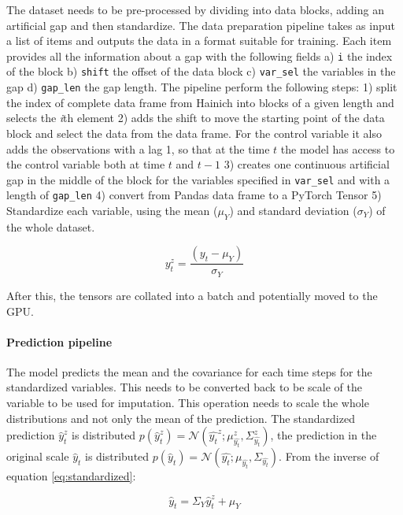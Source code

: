 \documentclass{article}
\newcommand{\norm}[3]{\mathcal{N}\left(#1; #2, #3\right)} %
\begin{document}
The dataset needs to be pre-processed by dividing into data blocks, adding an artificial gap and then standardize. The data preparation pipeline takes as input a list of items and outputs the data in a format suitable for training. Each item provides all the information about a gap with the following fields a) \verb|i| the index of the block b) \verb|shift|  the offset of the data block c) \verb|var_sel| the variables in the gap d) \verb|gap_len| the gap length. The pipeline perform the following steps: 1) split the index of complete data frame from Hainich into blocks of a given length and selects the \textit{i}th element  2) adds the shift to move the starting point of the data block and select the data from the data frame. For the control variable it also adds the observations with a lag 1, so that at the time $t$ the model has access to the control variable both at time $t$ and $t-1$ 3) creates one continuous artificial gap in the middle of the block for the variables specified in \verb|var_sel| and with a length of \verb|gap_len| 4) convert from Pandas data frame to a \textsf{PyTorch} Tensor 5) Standardize each variable, using the mean ($\mu_Y$) and standard deviation ($\sigma_Y$) of the whole dataset.

\begin{equation}\label{eq:standardized}
    y^z_t = \frac{(y_t - \mu_Y)}{\sigma_Y}
\end{equation}

After this, the tensors are collated into a batch and potentially moved to the GPU.

\paragraph{Prediction pipeline}

The model predicts the mean and the covariance for each time steps for the standardized variables. This needs to be converted back to be scale of the variable to be used for imputation. This operation needs to scale the whole distributions and not only the mean of the prediction. The standardized prediction $\hat{y}^z_t$ is distributed $p(\hat{y}^z_t) = \norm{\hat{y_t}^z}{\mu^z_{\hat{y_t}}}{\Sigma^z_{\hat{y_t}}}$, the prediction in the original scale $\hat{y}_t$ is distributed $p(\hat{y}_t) =  \norm{\hat{y_t}}{\mu_{\hat{y_t}}}{\Sigma_{\hat{y_t}}}$. From the inverse of equation \ref{eq:standardized}:

\begin{equation*}
    \hat{y}_t = \Sigma_Y\hat{y}^z_t + \mu_Y
\end{equation*}
\end{document}

